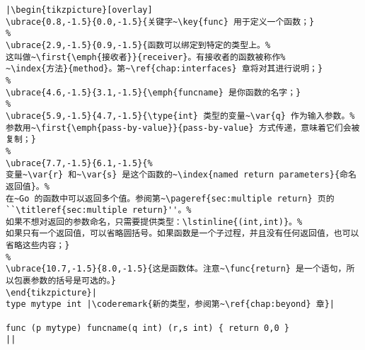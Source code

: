 \begin{lstlisting}[caption=函数定义,label=src:function definition]
|\begin{tikzpicture}[overlay]
\ubrace{0.8,-1.5}{0.0,-1.5}{关键字~\key{func} 用于定义一个函数；}
%
\ubrace{2.9,-1.5}{0.9,-1.5}{函数可以绑定到特定的类型上。%
这叫做~\first{\emph{接收者}}{receiver}。有接收者的函数被称作%
~\index{方法}{method}。第~\ref{chap:interfaces} 章将对其进行说明；}
%
\ubrace{4.6,-1.5}{3.1,-1.5}{\emph{funcname} 是你函数的名字；}
%
\ubrace{5.9,-1.5}{4.7,-1.5}{\type{int} 类型的变量~\var{q} 作为输入参数。%
参数用~\first{\emph{pass-by-value}}{pass-by-value} 方式传递，意味着它们会被复制；}
%
\ubrace{7.7,-1.5}{6.1,-1.5}{%
变量~\var{r} 和~\var{s} 是这个函数的~\index{named return parameters}{命名返回值}。%
在~Go 的函数中可以返回多个值。参阅第~\pageref{sec:multiple return} 页的``\titleref{sec:multiple return}''。%
如果不想对返回的参数命名，只需要提供类型：\lstinline{(int,int)}。%
如果只有一个返回值，可以省略圆括号。如果函数是一个子过程，并且没有任何返回值，也可以省略这些内容；}
%
\ubrace{10.7,-1.5}{8.0,-1.5}{这是函数体。注意~\func{return} 是一个语句，所以包裹参数的括号是可选的。}
\end{tikzpicture}|
type mytype int	|\coderemark{新的类型，参阅第~\ref{chap:beyond} 章}|

func (p mytype) funcname(q int) (r,s int) { return 0,0 }
||
\end{lstlisting}
